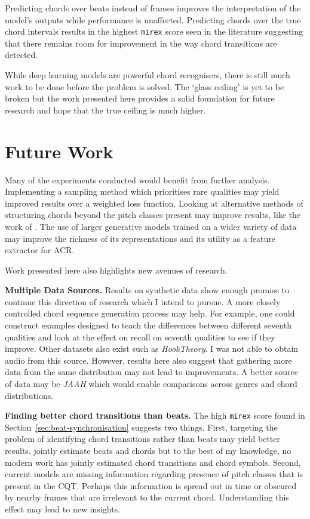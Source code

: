 Predicting chords over beats instead of frames improves the interpretation of the model's outputs while performance is unaffected. Predicting chords over the true chord intervals results in the highest \texttt{mirex} score seen in the literature suggesting that there remains room for improvement in the way chord transitions are detected.

While deep learning models are powerful chord recognisers, there is still much work to be done before the problem is solved. The `glass ceiling' is yet to be broken but the work presented here provides a solid foundation for future research and hope that the true ceiling is much higher.

\section{Future Work}

Many of the experiments conducted would benefit from further analysis. Implementing a sampling method which prioritises rare qualities may yield improved results over a weighted loss function. Looking at alternative methods of structuring chords beyond the pitch classes present may improve results, like the work of \citet{ACRLargeVocab1}.  The use of larger generative models trained on a wider variety of data may improve the richness of its representations and its utility as a feature extractor for ACR.

Work presented here also highlights new avenues of research.

\textbf{Multiple Data Sources.} Results on synthetic data show enough promise to continue this direction of research which I intend to pursue. A more closely controlled chord sequence generation process may help. For example, one could construct examples designed to teach the differences between different seventh qualities and look at the effect on recall on seventh qualities to see if they improve. Other datasets also exist such as \emph{HookTheory}. I was not able to obtain audio from this source. However, results here also suggest that gathering more data from the same distribution may not lead to improvements. A better source of data may be \emph{JAAH} which would enable comparisons across genres and chord distributions.

\textbf{Finding better chord transitions than beats.} The high \texttt{mirex} score found in Section~\ref{sec:beat-synchronisation} suggests two things. First, targeting the problem of identifying chord transitions rather than beats may yield better results. \citet{ChorusAlignmentJAAH} jointly estimate beats and chords but to the best of my knowledge, no modern work has jointly estimated chord transitions and chord symbols. Second, current models are missing information regarding presence of pitch classes that is present in the CQT. Perhaps this information is spread out in time or obscured by nearby frames that are irrelevant to the current chord. Understanding this effect may lead to new insights.

